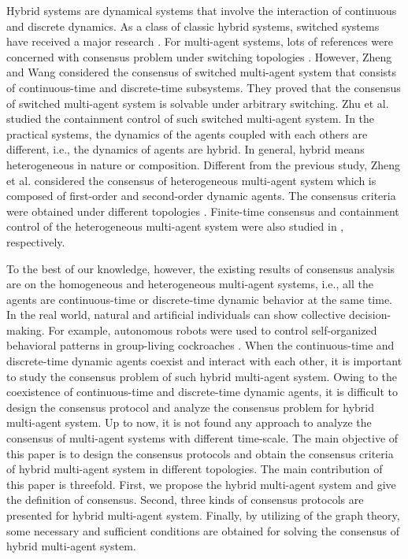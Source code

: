 \documentclass[12pt,draftcls,onecolumn]{IEEEtran}
\begin{document}
Hybrid systems are dynamical systems that involve the interaction of continuous and discrete dynamics. As a class of classic hybrid systems, switched systems have received a major research \cite{Antsaklis2000}. For multi-agent systems, lots of references were concerned with consensus problem under switching topologies \cite{sabertac04,Sun08}. However, Zheng and Wang \cite{Zheng2015} considered the consensus of switched multi-agent system that consists of continuous-time and discrete-time subsystems. They proved that the consensus of switched multi-agent system is solvable under arbitrary switching. Zhu et al. \cite{zhu2015} studied the containment control of such switched multi-agent system. In the practical systems, the dynamics of the agents coupled with each others are different, i.e., the dynamics of agents are hybrid. In general, hybrid means heterogeneous in nature or composition. Different from the previous study, Zheng et al. \cite{zheng11-2} considered the consensus of heterogeneous multi-agent system which is composed of first-order and second-order dynamic agents. The consensus criteria were obtained under different topologies \cite{zheng12-3,zheng12-1}. Finite-time consensus and containment control of the heterogeneous multi-agent system were also studied in \cite{zheng12-2,Zheng14}, respectively.

To the best of our knowledge, however, the existing results of consensus analysis are on the homogeneous and heterogeneous multi-agent systems, i.e., all the agents are continuous-time or discrete-time dynamic behavior at the same time. In the real world, natural and artificial individuals can show collective decision-making. For example, autonomous robots were used to control self-organized behavioral patterns in group-living cockroaches \cite{Halloy2007}. When the continuous-time and discrete-time dynamic agents coexist and interact with each other, it is important to study the consensus problem of such hybrid multi-agent system.  Owing to the coexistence of continuous-time and discrete-time dynamic agents, it is difficult to design the consensus protocol and analyze the consensus problem for hybrid multi-agent system. Up to now, it is not found any approach to analyze the consensus of multi-agent systems with different time-scale. The main objective of this paper is to design the consensus protocols and obtain the consensus criteria of hybrid multi-agent system in different topologies. The main contribution of this paper is threefold. First, we propose the hybrid multi-agent system and give the definition of consensus. Second, three kinds of consensus protocols are presented for hybrid multi-agent system. Finally, by utilizing of the graph theory, some necessary and sufficient conditions are obtained for solving the consensus of hybrid multi-agent system.
\end{document}
